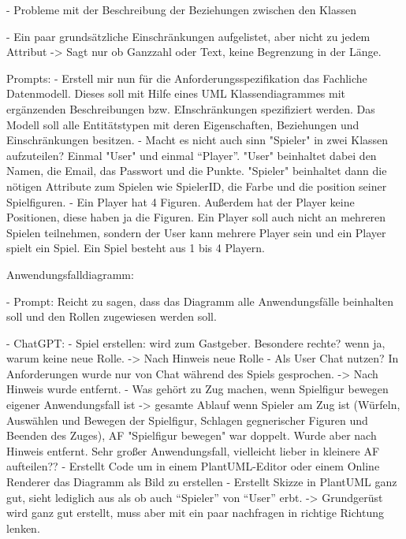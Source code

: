     - Probleme mit der Beschreibung der Beziehungen zwischen den Klassen

    - Ein paar grundsätzliche Einschränkungen aufgelistet, aber nicht zu jedem Attribut -> Sagt nur ob Ganzzahl oder Text,
    keine Begrenzung in der Länge.

    Prompts:
        - Erstell mir nun für die Anforderungsspezifikation das Fachliche Datenmodell. Dieses soll mit Hilfe eines UML Klassendiagrammes mit ergänzenden Beschreibungen bzw. EInschränkungen spezifiziert werden. Das Modell soll alle Entitätstypen mit deren Eigenschaften, Beziehungen und Einschränkungen besitzen.
        - Macht es nicht auch sinn "Spieler" in zwei Klassen
        aufzuteilen? Einmal "User" und einmal ``Player''.  "User" beinhaltet dabei den Namen, die Email, das Passwort und die Punkte. "Spieler" beinhaltet dann die nötigen Attribute zum Spielen wie SpielerID, die Farbe und die position seiner Spielfiguren.
        - Ein Player hat 4 Figuren. Außerdem hat der Player keine Positionen, diese haben ja die Figuren. Ein Player soll auch nicht an mehreren Spielen teilnehmen, sondern der User kann mehrere Player sein und ein Player spielt ein Spiel. Ein Spiel besteht aus 1 bis 4 Playern.




Anwendungsfalldiagramm:

- Prompt: Reicht zu sagen, dass das Diagramm alle Anwendungsfälle beinhalten soll und den Rollen zugewiesen werden soll.

- ChatGPT:
    - Spiel erstellen: wird zum Gastgeber. Besondere rechte? wenn ja, warum keine neue Rolle. -> Nach Hinweis neue Rolle
    - Als User Chat nutzen? In Anforderungen wurde nur von Chat während des Spiels gesprochen. -> Nach Hinweis wurde entfernt.
    - Was gehört zu Zug machen, wenn Spielfigur bewegen eigener Anwendungsfall ist -> gesamte Ablauf wenn Spieler am Zug ist
    (Würfeln, Auswählen und Bewegen der Spielfigur, Schlagen gegnerischer Figuren und Beenden des Zuges), AF "Spielfigur bewegen" 
    war doppelt. Wurde aber nach Hinweis entfernt. Sehr großer Anwendungsfall, vielleicht lieber in kleinere AF aufteilen??
    - Erstellt Code um in einem PlantUML-Editor oder einem Online Renderer das Diagramm als Bild zu erstellen
    - Erstellt Skizze in PlantUML ganz gut, sieht lediglich aus als ob auch ``Spieler'' von ``User'' erbt.
    -> Grundgerüst wird ganz gut erstellt, muss aber mit ein paar nachfragen in richtige Richtung lenken.
